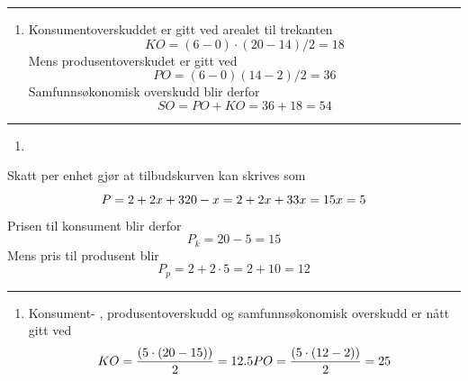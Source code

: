 \documentclass[
  letterpaper,
  DIV=11,
  numbers=noendperiod]{scrartcl}
\providecommand{\tightlist}{%
  \setlength{\itemsep}{0pt}\setlength{\parskip}{0pt}}\usepackage{longtable,booktabs,array}
\begin{document}
\begin{center}\rule{0.5\linewidth}{0.5pt}\end{center}

\begin{enumerate}
\def\labelenumi{\alph{enumi})}
\setcounter{enumi}{1}
\tightlist
\item
  Konsumentoverskuddet er gitt ved arealet til trekanten
  \begin{equation*}
  KO = (6-0)\cdot(20-14)/2 = 18
  \end{equation*} Mens produsentoverskudet er gitt ved \begin{equation*}
  PO = (6-0)(14-2)/2 = 36
  \end{equation*} Samfunnsøkonomisk overskudd blir derfor
  \begin{equation*}
  SO = PO+KO =36+18=54
  \end{equation*}
\end{enumerate}

\begin{center}\rule{0.5\linewidth}{0.5pt}\end{center}

\begin{enumerate}
\def\labelenumi{\alph{enumi})}
\setcounter{enumi}{2}
\tightlist
\item
\end{enumerate}

Skatt per enhet gjør at tilbudskurven kan skrives som \begin{equation*}
P = 2+2x + 3 \\
20-x=2+2x+3 \\
3x   =15 \\
x = 5
\end{equation*} Prisen til konsument blir derfor \begin{equation*}
P_k = 20 - 5 = 15
\end{equation*} Mens pris til produsent blir \begin{equation*}
P_p=2+2\cdot5 = 2+10 = 12
\end{equation*}

\begin{center}\rule{0.5\linewidth}{0.5pt}\end{center}

\begin{enumerate}
\def\labelenumi{\alph{enumi})}
\setcounter{enumi}{3}
\tightlist
\item
  Konsument- , produsentoverskudd og samfunnsøkonomisk overskudd er nått
  gitt ved \begin{equation*}
  KO = \frac{(5\cdot (20-15))}{2}  = 12.5\\
  PO = \frac{(5\cdot (12-2))}{2} = 25
  \end{equation*}
\end{enumerate}
\end{document}
